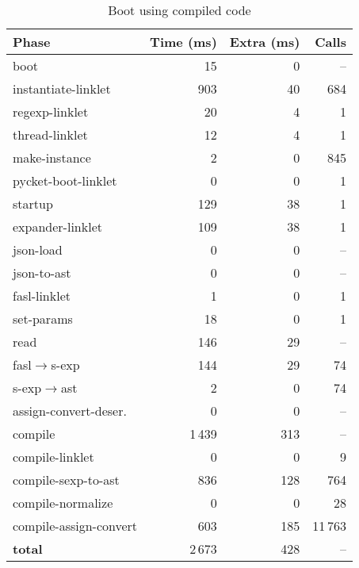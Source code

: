 		\begin{table}[ht]
		\centering
		\begin{tabular}{@{}lrrr@{}}
			\toprule
			Phase & Time (ms) & Extra (ms) & Calls \\ \midrule
			boot                           &     15 &    0 & -- \\
			instantiate-linklet            &    903 &   40 & 684 \\
			regexp-linklet                 &     20 &    4 & 1 \\
			thread-linklet                 &     12 &    4 & 1 \\
			make-instance                  &      2 &    0 & 845 \\
			pycket-boot-linklet            &      0 &    0 & 1 \\
			startup                        &    129 &   38 & 1 \\
			\quad expander-linklet         &    109 &   38 & 1 \\
			\quad json-load                &      0 &    0 & -- \\
			\quad json-to-ast              &      0 &    0 & -- \\
			\quad fasl-linklet             &      1 &    0 & 1 \\
			\quad set-params               &     18 &    0 & 1 \\ \midrule
			read                           &    146 &   29 & -- \\
			\quad fasl$\rightarrow$s-exp   &    144 &   29 & 74 \\
			\quad s-exp$\rightarrow$ast    &      2 &    0 & 74 \\
			\quad assign-convert-deser.    &      0 &    0 & -- \\ \midrule
			compile                        &  1\,439 &  313 & -- \\
			\quad compile-linklet          &      0 &    0 & 9 \\
			\quad compile-sexp-to-ast      &    836 &  128 & 764 \\
			\quad compile-normalize        &      0 &    0 & 28 \\
			\quad compile-assign-convert   &    603 &  185 & 11\,763 \\ \midrule
			\textbf{total}                 &  2\,673 &  428 & -- \\
			\bottomrule
		\end{tabular}
		\caption{Boot using compiled code}
		\label{tab:boot-no-compiled}
		\end{table}



